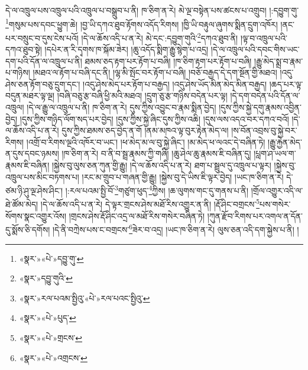 དེ་ལ་འཁྲུལ་པས་འཁྲུལ་པའི་འཁྲུལ་པ་བསྒྲུབ་པ་ནི། ཁ་ཅིག་ན་རེ། མེ་ལྔ་བསྟེན་པས་ཚངས་པ་འགྲུབ། །:དབྱུག་གུ་\footnote{«སྣར་»«པེ་»དབྱུ་གུ་}གསུམ་པས་དབང་ཕྱུག་ཆེ། །བྱ་ཡི་དཀའ་ཐུབ་རྟོགས་འདོད་རིགས། །ཁྱི་ཡི་བརྟུལ་ཞུགས་སྨིན་དྲུག་འཁོར། །ནང་པར་བསྲུང་བ་དུས་ངེས་པའོ། །དེ་ལ་ཆོས་འདི་པ་ན་རེ། མེ་དང་:དབྱུག་གུའི་\footnote{«སྣར་»དབྱུ་གུའི་}དཀའ་ཐུབ་ནི། །ལྟ་བ་འཁྲུལ་པའི་དཀའ་ཐུབ་སྟེ། །དཔེར་ན་རི་དྭགས་ཁ་སྐོམ་ཟེར། །ཆུ་འདོད་སྨིག་རྒྱུ་སྙེག་པ་འདྲ། །དེ་ལ་འཁྲུལ་པའི་དབང་གིས་ཡང་དག་པའི་དོན་ལ་འཁྲུལ་པ་ནི། ཐམས་ཅད་རྟག་པར་རྟོག་པ་བཞི། །ཁ་ཅིག་རྟག་པར་རྟོག་པ་བཞི། །རྒྱུ་མེད་སྨྲ་བ་རྣམ་པ་གཉིས། །མཐའ་ལ་རྟོག་པ་བཞི་དང་ནི། །ལྷ་མི་སྤོང་བར་རྟོག་པ་བཞི། །བཅོ་བརྒྱད་དེ་དག་སྔོན་གྱི་མཐའ། །འདུ་ཤེས་ཅན་རྟོག་བཅུ་དྲུག་དང་། །འདུ་ཤེས་མེད་པར་རྟོག་པ་བརྒྱད། །འདུ་ཤེས་ཡོད་མིན་མེད་མིན་བརྒྱད། །ཆད་པར་ལྟ་བདུན་མཐར་ལྟ་ལྔ། །བཞི་བཅུ་རྩ་བཞི་ཕྱི་མའི་མཐའ། །དྲུག་ཅུ་རྩ་གཉིས་བདེན་པར་ལྟ། །དེ་དག་བདེན་པའི་དོན་ལ་འཁྲུལ། །དེ་ལ་རྒྱུ་ལ་འཁྲུལ་པ་ནི། ཁ་ཅིག་ན་རེ། དུས་ཀྱིས་འབྱུང་བ་རྣམ་སྨིན་བྱེད། །དུས་ཀྱིས་སྐྱེ་དགུ་རྣམས་འབྱིན་བྱེད། །དུས་ཀྱིས་གཉིད་ལོག་སད་པར་བྱེད། །དུས་ཀྱིས་སྐྱེ་ཞིང་དུས་ཀྱིས་འཆི། །དུས་ལས་འདའ་བར་དཀའ་བའོ། །དེ་ལ་ཆོས་འདི་པ་ན་རེ། དུས་ཀྱིས་ཐམས་ཅད་བྱེད་ན་གོ །ནམ་མཁའ་ལྟ་བུར་རྟེན་མེད་ལ། །ས་བོན་འབྲས་བུ་སྐྱེ་བར་རིགས། །འགྲོ་བ་རིགས་ལྔའི་འཁོར་བ་ཡང་། །ཕ་མེད་མ་ལ་བུ་སྐྱེ་ཞིང་། །མ་མེད་ཕ་ལའང་དེ་བཞིན་ཏེ། །རྒྱུ་རྐྱེན་མེད་ན་དུས་དབང་ཉམས། །ཁ་ཅིག་ན་རེ། བ་ནི་བ་སྦྲ་རྣམས་ཀྱི་གཞི། །ཆུ་ཤེལ་ཆུ་རྣམས་ཇི་བཞིན་དུ། །པླག་ཤ་ཡལ་ག་རྣམས་ཇི་བཞིན། །སྐྱེས་བུ་ལུས་ཅན་ཀུན་གྱི་རྒྱུ། །དེ་ལ་ཆོས་འདི་པ་ན་རེ། ཐག་པ་སྦྲུལ་དུ་འཁྲུལ་པ་ལྟར། །སྐྱེས་བུ་འཁྲུལ་པས་མིང་བཏགས་པ། །རང་མ་གྲུབ་པ་གཞན་གྱི་རྒྱུ། །སྐྱེས་བུ་དེ་ཡིས་ཇི་ལྟར་བྱེད། །ཡང་ཁ་ཅིག་ན་རེ། དེ་ཙམ་ཉི་ཤུ་ལྔ་ཤེས་ཤིང་། །:རལ་པའམ་སྤྱི་བོ་\footnote{«སྣར་»རལ་པའམ་སྤྱིའུ་«པེ་»རལ་པའང་སྤྱིའུ་}གཙུག་ཕུད་\footnote{«སྣར་»«པེ་»པུད་}ཀྱིས། །ཆ་ལུགས་གང་དུ་གནས་པ་ནི། །གྲོལ་འགྱུར་འདི་ལ་ཐེ་ཚོམ་མེད། །དེ་ལ་ཆོས་འདི་པ་ན་རེ། དེ་ལྟར་གྲངས་ཤེས་མཐོ་རིས་འགྱུར་ན་ནི། །རྡོ་ཤིང་བགྲངས་\footnote{«སྣར་»«པེ་»གྲངས་}པས་གསེར་སོགས་སྣང་འགྱུར་འོས། །གྲངས་ཤེས་རྡོ་ཤིང་འདྲ་ལ་མཐོ་རིས་གསེར་བཞིན་ཏེ། །ཀུན་རྫོབ་རིགས་པར་འགལ་ན་དོན་དུ་སྨོས་ཅི་དགོས། །དེ་ནི་བཀྲེས་པས་ང་བགྲངས་\footnote{«སྣར་»«པེ་»འགྲངས་}ཟེར་བ་འདྲ། །ཡང་ཁ་ཅིག་ན་རེ། ལུས་ཅན་འདི་དག་སྐྱེས་པ་ནི། །
